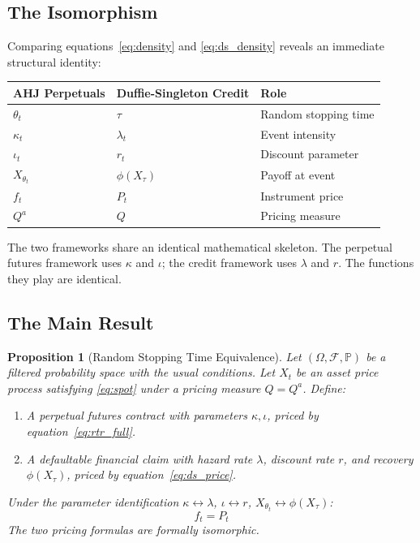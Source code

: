 \documentclass[10pt,twocolumn]{article}
\theoremstyle{plain}
\newtheorem{proposition}{Proposition}
\theoremstyle{definition}
\newcommand{\Qa}{Q^a}
\newcommand{\Prob}{\mathbb{P}}
\newcommand{\F}{\mathcal{F}}
\begin{document}
\subsection{The Isomorphism}

Comparing equations~\eqref{eq:density} and \eqref{eq:ds_density}
reveals an immediate structural identity:

\begin{center}
\small
\begin{tabular}{@{}lll@{}}
\toprule
\textbf{AHJ Perpetuals} & \textbf{Duffie-Singleton Credit} & \textbf{Role} \\
\midrule
$\theta_t$ & $\tau$ & Random stopping time \\
$\kappa_t$ & $\lambda_t$ & Event intensity \\
$\iota_t$ & $r_t$ & Discount parameter \\
$X_{\theta_t}$ & $\phi(X_\tau)$ & Payoff at event \\
$f_t$ & $P_t$ & Instrument price \\
$\Qa$ & $Q$ & Pricing measure \\
\bottomrule
\end{tabular}
\end{center}

The two frameworks share an identical mathematical skeleton. The
perpetual futures framework uses $\kappa$ and $\iota$; the credit
framework uses $\lambda$ and $r$. The functions they play are
identical.

\subsection{The Main Result}
\label{sec:main_theorem}

\begin{proposition}[Random Stopping Time Equivalence]
\label{prop:equiv}
Let $(\Omega,\F,\Prob)$ be a filtered probability space with the
usual conditions. Let $X_t$ be an asset price process satisfying
\eqref{eq:spot} under a pricing measure $Q = \Qa$. Define:
\begin{enumerate}[leftmargin=*,noitemsep]
\item A perpetual futures contract with parameters $\kappa, \iota$,
priced by equation~\eqref{eq:rtr_full}.
\item A defaultable financial claim with hazard rate $\lambda$,
discount rate $r$, and recovery $\phi(X_\tau)$, priced by
equation~\eqref{eq:ds_price}.
\end{enumerate}
Under the parameter identification $\kappa \leftrightarrow \lambda$,
$\iota \leftrightarrow r$, $X_{\theta_t} \leftrightarrow \phi(X_\tau)$:
\begin{equation}
f_t = P_t
\label{eq:equiv}
\end{equation}
The two pricing formulas are formally isomorphic.
\end{proposition}
\end{document}
